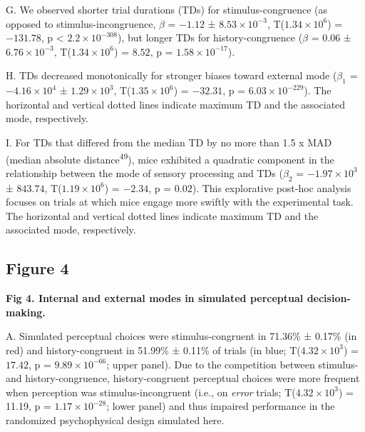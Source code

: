 \documentclass[
]{article}
\begin{document}
G. We observed shorter trial durations (TDs) for stimulus-congruence (as
opposed to stimulus-incongruence, \(\beta\) = \(-1.12\) ±
\(\ensuremath{8.53\times 10^{-3}}\),
T(\(\ensuremath{1.34\times 10^{6}}\)) = \(-131.78\), p < \(\ensuremath{2.2\times 10^{-308}}\)), but
longer TDs for history-congruence (\(\beta\) = \(0.06\) ±
\(\ensuremath{6.76\times 10^{-3}}\),
T(\(\ensuremath{1.34\times 10^{6}}\)) = \(8.52\), p =
\(\ensuremath{1.58\times 10^{-17}}\)).

H. TDs decreased monotonically for stronger biases toward external mode
(\(\beta_1\) = \(\ensuremath{-4.16\times 10^{4}}\) ±
\(\ensuremath{1.29\times 10^{3}}\),
T(\(\ensuremath{1.35\times 10^{6}}\)) = \(-32.31\), p =
\(\ensuremath{6.03\times 10^{-229}}\)). The horizontal and vertical
dotted lines indicate maximum TD and the associated mode, respectively.

I. For TDs that differed from the median TD by no more than 1.5 x MAD
(median absolute distance\textsuperscript{49}), mice exhibited a
quadratic component in the relationship between the mode of sensory
processing and TDs (\(\beta_2\) = \(\ensuremath{-1.97\times 10^{3}}\) ±
\(843.74\), T(\(\ensuremath{1.19\times 10^{6}}\)) = \(-2.34\), p =
\(0.02\)). This explorative post-hoc analysis focuses on trials at which
mice engage more swiftly with the experimental task. The horizontal and
vertical dotted lines indicate maximum TD and the associated mode,
respectively.

\newpage

\hypertarget{figure-4}{%
\subsection{Figure 4}\label{figure-4}}


\textbf{Fig 4. Internal and external modes in simulated perceptual
decision-making.}

A. Simulated perceptual choices were stimulus-congruent in 71.36\% ±
0.17\% (in red) and history-congruent in 51.99\% ± 0.11\% of trials (in
blue; T(\(\ensuremath{4.32\times 10^{3}}\)) = \(17.42\), p =
\(\ensuremath{9.89\times 10^{-66}}\); upper panel). Due to the
competition between stimulus- and history-congruence, history-congruent
perceptual choices were more frequent when perception was
stimulus-incongruent (i.e., on \emph{error} trials;
T(\ensuremath{4.32\times 10^{3}}) = 11.19, p =
\(\ensuremath{1.17\times 10^{-28}}\); lower panel) and thus impaired
performance in the randomized psychophysical design simulated here.
\end{document}

